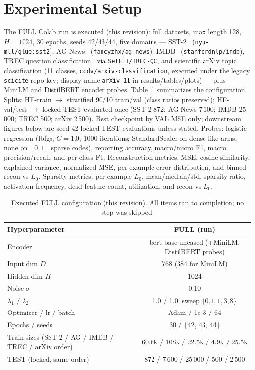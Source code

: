 \documentclass[conference]{IEEEtran}
\begin{document}
\section{Experimental Setup}
\label{sec:setup}
The FULL Colab run is executed (this revision): full datasets, max length
128, $H=1024$, 30 epochs, seeds 42/43/44, five domains --- SST-2~\cite{socher2013recursive}
(\texttt{nyu-mll/glue:sst2}), AG News~\cite{zhang2015character}
(\texttt{fancyzhx/ag\_news}), IMDB~\cite{maas2011learning}
(\texttt{stanfordnlp/imdb}), TREC question classification~\cite{li2002learning} via
\texttt{SetFit/TREC-QC}, and scientific arXiv topic classification (11
classes, \texttt{ccdv/arxiv-classification}, executed under the legacy
\texttt{scicite} repo key; display name \texttt{arXiv-11} in results/tables/plots) --- plus MiniLM and DistilBERT encoder probes.
Table~\ref{tab:config} summarizes the configuration.
Splits: HF-train $\rightarrow$ stratified
90/10 train/val (class ratios preserved); HF-val/test $\rightarrow$ locked
TEST evaluated once (SST-2 872; AG News 7\,600; IMDB 25\,000; TREC 500;
arXiv 2\,500). Best checkpoint by VAL MSE only; downstream figures below
are seed-42 locked-TEST evaluations unless stated. Probes: logistic
regression (lbfgs, $C=1.0$, 1000 iterations; StandardScaler on dense-like
arms, none on $[0,1]$ sparse codes), reporting accuracy, macro/micro F1,
macro precision/recall, and per-class F1. Reconstruction metrics: MSE,
cosine similarity, explained variance, normalized MSE, per-example error
distribution, and binned recon-vs-$L_0$. Sparsity metrics: per-example
$L_0$, mean/median/std, sparsity ratio, activation frequency, dead-feature
count, utilization, and recon-vs-$L_0$.

\begin{table}[t]
\caption{Executed FULL configuration (this revision). All items ran to completion; no step was skipped.}
\label{tab:config}
\centering
\begin{tabular}{lc}
\hline
\textbf{Hyperparameter} & \textbf{FULL (run)} \\
\hline
Encoder & bert-base-uncased (+MiniLM, DistilBERT probes) \\
Input dim $D$ & 768 (384 for MiniLM) \\
Hidden dim $H$ & 1024 \\
Noise $\sigma$ & 0.10 \\
$\lambda_1$ / $\lambda_2$ & 1.0 / 1.0, sweep $\{0.1,1,3,8\}$ \\
Optimizer / lr / batch & Adam / 1e-3 / 64 \\
Epochs / seeds & 30 / \{42, 43, 44\} \\
Train sizes (SST-2 / AG / IMDB / TREC / arXiv order) & 60.6k / 108k / 22.5k / 4.9k / 25.5k \\
TEST (locked, same order) & 872 / 7\,600 / 25\,000 / 500 / 2\,500 \\
\hline
\end{tabular}
\end{table}
\end{document}
